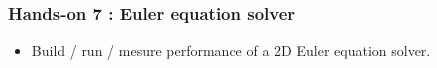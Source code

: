 \begin{frame}[fragile=singleslide]
  \frametitle{Hands-on 7 : Euler equation solver}

  \begin{itemize}
  \item Build / run / mesure performance of a 2D Euler equation solver.
  \end{itemize}
  
\end{frame}